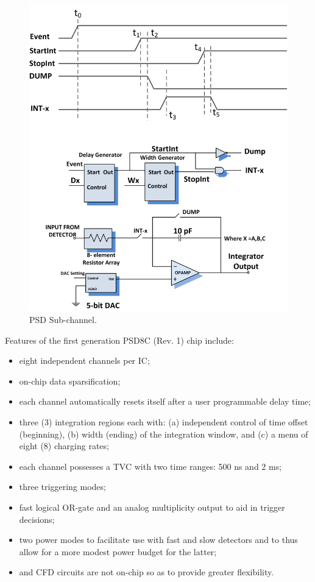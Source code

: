 \documentclass[12pt,oneside,final]{siuethesis}
\theoremstyle{definition}
\begin{document}
\begin{figure}[htbp!]
	\centering
 	\includegraphics[scale=1.3,keepaspectratio=true]{./ch1_figures/PSD_sub_channel.png}
 	\caption{PSD Sub-channel.}
 	\label{FIG:PSD_SUB_CHANNEL}
\end{figure}

Features of the first generation PSD8C (Rev. 1) chip include:
\begin{itemize}
\item
eight independent channels per IC;
\item
on-chip data sparsification;
\item
each channel automatically resets itself after a user programmable delay time;
\item
three (3) integration regions each with: (a) independent
control of time offset (beginning), (b) width (ending) of the
integration window, and (c) a menu of eight (8) charging rates;
\item
each channel possesses a TVC with two time ranges: 500 ns and 2 ms;
\item
three triggering modes;
\item
fast logical OR-gate and an analog multiplicity output to aid in
trigger decisions;
\item
two power modes to facilitate use with fast and slow detectors
and to thus allow for a more modest power budget for the
latter; 
\item
and CFD circuits are not on-chip so as to provide greater flexibility.
\end{itemize}
\end{document}
